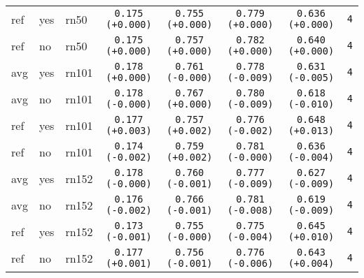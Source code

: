 \begin{tabular}{|l|l|l|c|c|c|c|c|}
\rowcolor{verylightgray}ref & yes & rn50 & \texttt{0.175 {\color{black}(+0.000)}} & \texttt{0.755 {\color{black}(+0.000)}} & \texttt{0.779 {\color{black}(+0.000)}} & \texttt{0.636 {\color{black}(+0.000)}} & \texttt{4} \\
\rowcolor{verylightgray}ref & no & rn50 & \texttt{0.175 {\color{black}(+0.000)}} & \texttt{0.757 {\color{black}(+0.000)}} & \texttt{0.782 {\color{black}(+0.000)}} & \texttt{0.640 {\color{black}(+0.000)}} & \texttt{4} \\
\hline
avg & yes & rn101 & \texttt{0.178 {\color{black}(+0.000)}} & \texttt{0.761 {\color{black}(-0.000)}} & \texttt{0.778 {\color{green}(-0.009)}} & \texttt{0.631 {\color{red}(-0.005)}} & \texttt{4} \\
avg & no & rn101 & \texttt{0.178 {\color{black}(-0.000)}} & \texttt{0.767 {\color{black}(+0.000)}} & \texttt{0.780 {\color{green}(-0.009)}} & \texttt{0.618 {\color{red}(-0.010)}} & \texttt{4} \\
ref & yes & rn101 & \texttt{0.177 {\color{green}(+0.003)}} & \texttt{0.757 {\color{red}(+0.002)}} & \texttt{0.776 {\color{green}(-0.002)}} & \texttt{0.648 {\color{green}(+0.013)}} & \texttt{4} \\
ref & no & rn101 & \texttt{0.174 {\color{red}(-0.002)}} & \texttt{0.759 {\color{red}(+0.002)}} & \texttt{0.781 {\color{black}(-0.000)}} & \texttt{0.636 {\color{red}(-0.004)}} & \texttt{4} \\
\hline
avg & yes & rn152 & \texttt{0.178 {\color{black}(-0.000)}} & \texttt{0.760 {\color{green}(-0.001)}} & \texttt{0.777 {\color{green}(-0.009)}} & \texttt{0.627 {\color{red}(-0.009)}} & \texttt{4} \\
avg & no & rn152 & \texttt{0.176 {\color{red}(-0.002)}} & \texttt{0.766 {\color{green}(-0.001)}} & \texttt{0.781 {\color{green}(-0.008)}} & \texttt{0.619 {\color{red}(-0.009)}} & \texttt{4} \\
ref & yes & rn152 & \texttt{0.173 {\color{red}(-0.001)}} & \texttt{0.755 {\color{black}(-0.000)}} & \texttt{0.775 {\color{green}(-0.004)}} & \texttt{0.645 {\color{green}(+0.010)}} & \texttt{4} \\
ref & no & rn152 & \texttt{0.177 {\color{green}(+0.001)}} & \texttt{0.756 {\color{green}(-0.001)}} & \texttt{0.776 {\color{green}(-0.006)}} & \texttt{0.643 {\color{green}(+0.004)}} & \texttt{4} \\
\hline
\end{tabular}
